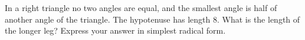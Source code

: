 In a right triangle no two angles are equal, and the smallest angle is half of another angle of the triangle. The hypotenuse has length $8$. What is the length of the longer leg? Express your answer in simplest radical form.
